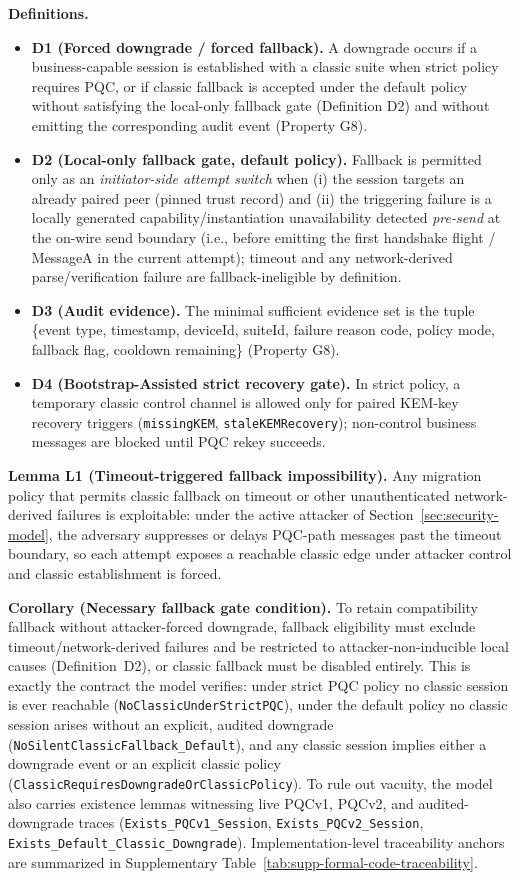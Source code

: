 \documentclass[10pt,journal,compsoc]{IEEEtran}
\providecommand{\tightlist}{%
  \setlength{\itemsep}{0pt}\setlength{\parskip}{0pt}}
\begin{document}
\textbf{Definitions.}
\begin{itemize}\tightlist
\item \textbf{D1 (Forced downgrade / forced fallback).} A downgrade occurs if a business-capable session is established with a classic suite when strict policy requires PQC, or if classic fallback is accepted under the default policy without satisfying the local-only fallback gate (Definition D2) and without emitting the corresponding audit event (Property G8).
\item \textbf{D2 (Local-only fallback gate, default policy).} Fallback is permitted only as an \emph{initiator-side attempt switch} when (i) the session targets an already paired peer (pinned trust record) and (ii) the triggering failure is a locally generated capability/instantiation unavailability detected \emph{pre-send} at the on-wire send boundary (i.e., before emitting the first handshake flight / MessageA in the current attempt); timeout and any network-derived parse/verification failure are fallback-ineligible by definition.
\item \textbf{D3 (Audit evidence).} The minimal sufficient evidence set is the tuple \{event type, timestamp, deviceId, suiteId, failure reason code, policy mode, fallback flag, cooldown remaining\} (Property G8).
\item \textbf{D4 (Bootstrap-Assisted strict recovery gate).} In strict policy, a temporary classic control channel is allowed only for paired KEM-key recovery triggers (\texttt{missingKEM}, \texttt{staleKEMRecovery}); non-control business messages are blocked until PQC rekey succeeds.
\end{itemize}

\textbf{Lemma L1 (Timeout-triggered fallback impossibility).}
Any migration policy that permits classic fallback on timeout or other
unauthenticated network-derived failures is exploitable: under the active
attacker of Section~\ref{sec:security-model}, the adversary suppresses or
delays PQC-path messages past the timeout boundary, so each attempt
exposes a reachable classic edge under attacker control and classic
establishment is forced.

\textbf{Corollary (Necessary fallback gate condition).}
To retain compatibility fallback without attacker-forced downgrade,
fallback eligibility must exclude timeout/network-derived failures and be
restricted to attacker-non-inducible local causes (Definition~D2), or
classic fallback must be disabled entirely. This is exactly the contract
the model verifies: under strict PQC policy no classic session is ever
reachable (\texttt{NoClassicUnderStrictPQC}), under the default policy no
classic session arises without an explicit, audited downgrade
(\texttt{NoSilentClassicFallback\_Default}), and any classic session
implies either a downgrade event or an explicit classic policy
(\texttt{ClassicRequiresDowngradeOrClassicPolicy}). To rule out vacuity,
the model also carries existence lemmas witnessing live PQCv1, PQCv2, and
audited-downgrade traces (\texttt{Exists\_PQCv1\_Session},
\texttt{Exists\_PQCv2\_Session},
\texttt{Exists\_Default\_Classic\_Downgrade}). Implementation-level
traceability anchors are summarized in Supplementary
Table~\ref{tab:supp-formal-code-traceability}.
\end{document}
